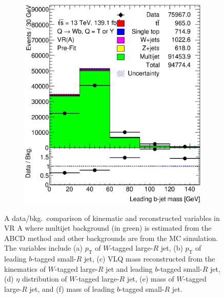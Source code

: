 \begin{figure}[hbt!]
\begin{subfigure}{.35\textwidth}
		\caption{}
		\label{fig:abcd:estimate:ljet_m}
	\end{subfigure}\hspace{0.6cm}
	\begin{subfigure}{.35\textwidth}
		\centering
		\includegraphics[width=\linewidth,height=\textheight,keepaspectratio]{VR_B_jet_m.eps}
		\caption{}
		\label{fig:abcd:estimate:jet_m}
	\end{subfigure}
	\caption{A data/bkg.\ comparison of kinematic and reconstructed variables in VR A where multijet background (in green) is estimated from the ABCD method and other backgrounds are from the MC simulation. The variables include (a) $p_{\text{T}}$ of $W$-tagged large-$R$ jet, (b) $p_{\text{T}}$ of leading $b$-tagged small-$R$ jet, (c) VLQ mass reconstructed from the kinematics of $W$-tagged large-$R$ jet and leading $b$-tagged small-$R$ jet, (d) $\eta$ distribution of $W$-tagged large-$R$ jet, (e) mass of $W$-tagged large-$R$ jet, and (f) mass of leading $b$-tagged small-$R$ jet.}
	\label{fig:abcd:estimate}
\end{figure}

